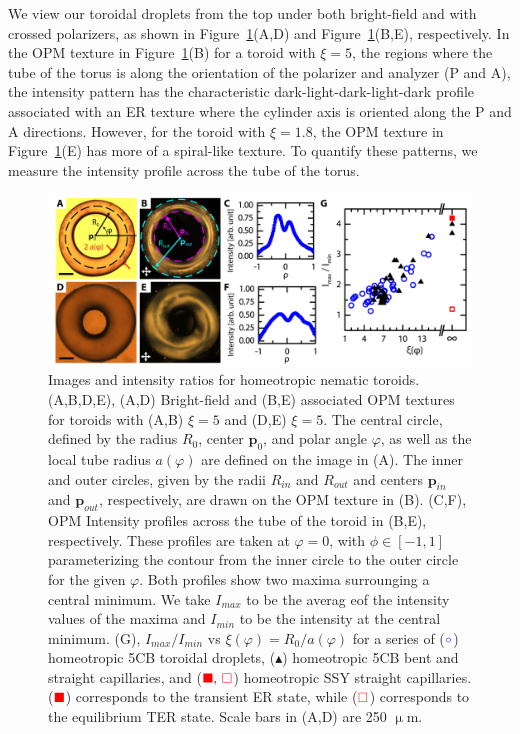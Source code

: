 We view our toroidal droplets from the top under both bright-field and with crossed polarizers, as shown in Figure~\ref{f:4-HomeoToroidsExp}(A,D) and Figure~\ref{f:4-HomeoToroidsExp}(B,E), respectively.
In the OPM texture in Figure~\ref{f:4-HomeoToroidsExp}(B) for a toroid with $\xi = 5$, the regions where the tube of the torus is along the orientation of the polarizer and analyzer (P and A), the intensity pattern has the characteristic dark-light-dark-light-dark profile associated with an ER texture where the cylinder axis is oriented along the P and A directions.
However, for the toroid with $\xi = 1.8$, the OPM texture in Figure~\ref{f:4-HomeoToroidsExp}(E) has more of a spiral-like texture.
To quantify these patterns, we measure the intensity profile across the tube of the torus.
\begin{figure}
  \centering
  \includegraphics{figures/C4/Ch4-Figs_HomeoToroidsExp.png}
  \caption{Images and intensity ratios for homeotropic nematic toroids.
  (A,B,D,E), (A,D) Bright-field and (B,E) associated OPM textures for toroids with (A,B) $\xi = 5$ and (D,E) $\xi = 5$.
  The central circle, defined by the radius $R_{0}$, center $\mathbf{p}_0$, and polar angle $\varphi$, as well as the local tube radius $a(\varphi)$ are defined on the image in (A).
  The inner and outer circles, given by the radii $R_{in}$ and $R_{out}$ and centers $\mathbf{p}_{in}$ and $\mathbf{p}_{out}$, respectively, are drawn on the OPM texture in (B).
  (C,F), OPM Intensity profiles across the tube of the toroid in (B,E), respectively.
  These profiles are taken at $\varphi = 0$, with $\phi \in [-1,1]$ parameterizing the contour from the inner circle to the outer circle for the given $\varphi$.
  Both profiles show two maxima surrounging a central minimum.
  We take $I_{max}$ to be the averag eof the intensity values of the maxima and $I_{min}$ to be the intensity at the central minimum.
  (G), $I_{max}/I_{min}$ vs $\xi(\varphi) = R_0/a(\varphi)$ for a series of (${\color{blue} \circ}$) homeotropic 5CB toroidal droplets, (${\blacktriangle}$) homeotropic 5CB bent and straight capillaries, and (${\color{red} \blacksquare},\,{\color{red} \square}$) homeotropic SSY straight capillaries.
     (${\color{red} \blacksquare}$) corresponds to the transient ER state, while (${\color{red} \square}$) corresponds to the equilibrium TER state.
     Scale bars in (A,D) are 250 $\upmu$m.}\label{f:4-HomeoToroidsExp}
\end{figure}

